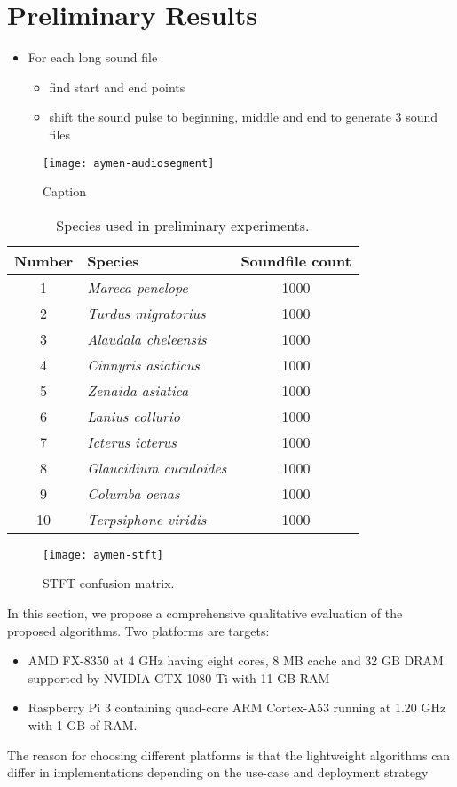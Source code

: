\chapter{Preliminary Results}

	\begin{itemize}
		\item For each long sound file
		\begin{itemize}
			\item find start and end points
			\item shift the sound pulse to beginning, middle and end
				to generate 3 sound files
		\end{itemize}
	\end{itemize}


\begin{figure}[h]
    \centering
    \texttt{[image: aymen-audiosegment]}
    \caption{Caption}
    \label{aymen-audiosegment}
\end{figure}

\begin{table}[h]
	\caption{Species used in preliminary experiments.}
    \label{tab:my_label}
    \centering
	\begin{tabular}{clc}
    \toprule
	\textbf{Number} & 
	\textbf{Species} &
	\textbf{Soundfile count} \\
	\midrule
	1 & \textit{Mareca penelope} & 1000 \\
	2 & \textit{Turdus migratorius} & 1000 \\
	3 & \textit{Alaudala cheleensis} & 1000 \\
	4 & \textit{Cinnyris asiaticus} &  1000 \\
	5 & \textit{Zenaida asiatica} & 1000 \\
	6 & \textit{Lanius collurio} & 1000 \\
	7 & \textit{Icterus icterus} & 1000 \\
	8 & \textit{Glaucidium cuculoides} & 1000 \\
	9 & \textit{Columba oenas} & 1000 \\
	10 & \textit{Terpsiphone viridis} & 1000 \\	
	\bottomrule
	\end{tabular}
\end{table}

\begin{figure}[h]
    \centering
    \texttt{[image: aymen-stft]}
    \caption{STFT confusion matrix.}
    \label{aymen-stft}
\end{figure}


In this section, we propose a comprehensive qualitative evaluation of the proposed algorithms. Two platforms are targets:
\begin{itemize}
\item AMD FX-8350 at 4 GHz having eight cores, 8 MB cache and 32 GB DRAM supported by NVIDIA GTX 1080 Ti with 11 GB RAM
\item Raspberry Pi 3 containing quad-core ARM Cortex-A53 running at 1.20 GHz with 1 GB of RAM.
\end{itemize}

\noindent The reason for choosing different platforms is that the lightweight algorithms can differ in implementations depending on the use-case and deployment strategy
